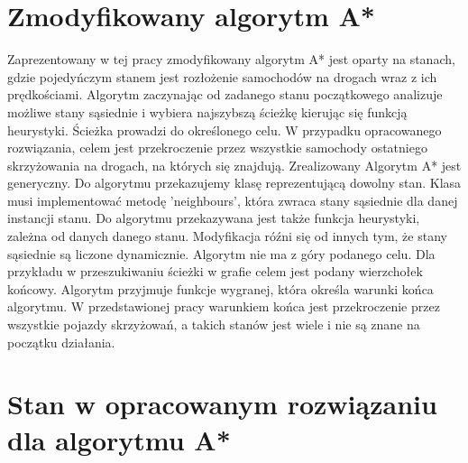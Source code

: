 \section{Zmodyfikowany algorytm A*}

Zaprezentowany w tej pracy zmodyfikowany algorytm A* jest oparty na stanach, gdzie pojedyńczym stanem jest rozłożenie samochodów na drogach wraz z ich prędkościami. Algorytm zaczynając od zadanego stanu początkowego analizuje możliwe stany sąsiednie i wybiera najszybszą ścieżkę kierując się funkcją heurystyki. Ścieżka prowadzi do określonego celu. W przypadku opracowanego rozwiązania, celem jest przekroczenie przez wszystkie samochody ostatniego skrzyżowania na drogach, na których się znajdują.
\newline
\indent
Zrealizowany Algorytm A* jest generyczny. Do algorytmu przekazujemy klasę reprezentującą dowolny stan. Klasa musi implementować metodę 'neighbours', która zwraca stany sąsiednie dla danej instancji stanu. Do algorytmu przekazywana jest także funkcja heurystyki, zależna od danych danego stanu.
\newline
\indent
Modyfikacja róźni się od innych tym, że stany sąsiednie są liczone dynamicznie. Algorytm nie ma z góry podanego celu. Dla przykładu w przeszukiwaniu ścieżki w grafie celem jest podany wierzchołek końcowy. Algorytm przyjmuje funkcje wygranej, która określa warunki końca algorytmu. W przedstawionej pracy warunkiem końca jest przekroczenie przez wszystkie pojazdy skrzyżowań, a takich stanów jest wiele i nie są znane na początku działania.

\section{Stan w opracowanym rozwiązaniu dla algorytmu A*}

